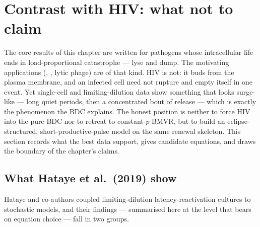 
\section{Contrast with HIV: what not to claim}
\label{sec:hiv}

The core results of this chapter are written for pathogens whose
intracellular life ends in load-proportional catastrophe --- lyse and dump.
The motivating applications (\yp{}, \ft{}, lytic phage) are of that kind.
HIV is not: it buds from the plasma membrane, and an infected cell need not
rupture and empty itself in one event. Yet single-cell and
limiting-dilution data show something that looks surge-like --- long quiet
periods, then a concentrated bout of release --- which is exactly the
phenomenon the BDC explains. The honest position is neither to force HIV
into the pure BDC nor to retreat to constant-$p$ BMVR, but to build an
eclipse-structured, short-productive-pulse model on the same renewal
skeleton. This section records what the best data support, gives candidate
equations, and draws the boundary of the chapter's claims.

\subsection{What Hataye et al.\ (2019) show}

Hataye and co-authors \cite{hataye2019principles} coupled
limiting-dilution latency-reactivation cultures to stochastic models, and
their findings --- summarised here at the level that bears on equation
choice --- fall in two groups.

